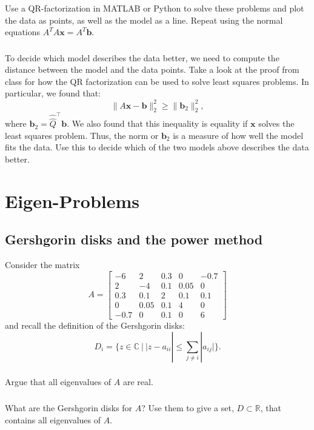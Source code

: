 \documentclass[11pt,letterpaper]{report}
\begin{document}
\subsection{} Use a QR-factorization in MATLAB or Python to solve these
  problems and plot the data as points, as well as the model as a
  line. Repeat using the normal equations $A^TA\boldsymbol x =
  A^T\boldsymbol b$.
\subsection{} To decide which model describes the data better, we need to
  compute the distance between the model and the data points. Take a
  look at the proof from class for how  the QR  factorization can be
  used to solve least squares  problems. In  particular, we found
  that:
  $$
  \|A\boldsymbol x  - \boldsymbol  b\|_2^2 \ge \|\boldsymbol b_2\|_2^2,
  $$ where $\boldsymbol b_2 = \hat{\hat Q}^\top\boldsymbol b$. We also
  found that this inequality is equality if $\boldsymbol x$ solves
  the least squares problem. Thus, the norm or $\boldsymbol b_2$ is a
  measure of how well the model fits the data. Use this to decide
  which of the two models above describes the data better.
\chapter{Eigen-Problems}
\section{Gershgorin disks and the power method}
Consider the matrix 
$$
A = \begin{bmatrix}
- 6 & 2 & 0.3 & 0 & -0.7 \\
2 & - 4 & 0.1 & 0.05 & 0 \\
0.3 & 0.1 & 2 & 0.1 & 0.1 \\
0 & 0.05 & 0.1 &  4 & 0 \\
-0.7 & 0 & 0.1  & 0  & 6
\end{bmatrix}
$$
and recall the definition of the Gershgorin disks:
\[
D_i = \{ z \in \mathbb C ~|~ |z - a_{ii}| \le \sum_{j \ne i} |a_{ij}| \}.
\]

\subsection{}
Argue that all eigenvalues of $A$ are real.

\subsection{}
What are the Gershgorin disks for $A$?  Use them to give a set, $D \subset \mathbb{R}$, that contains all eigenvalues of $A$.
\end{document}
